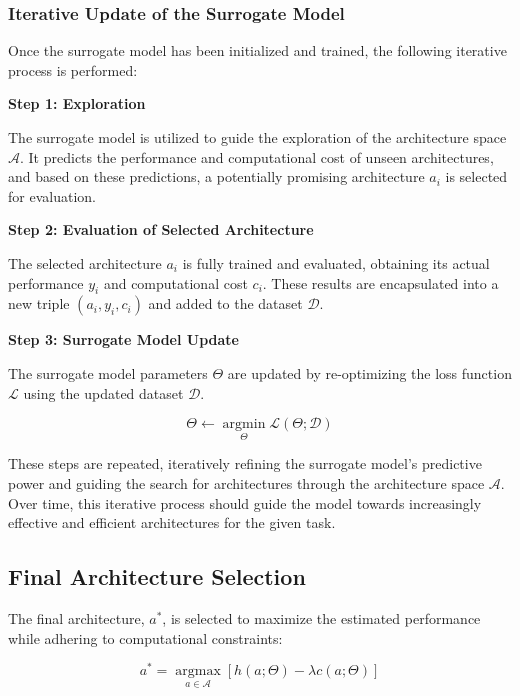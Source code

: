 \documentclass{article}
\begin{document}
\subsubsection{Iterative Update of the Surrogate Model}

Once the surrogate model has been initialized and trained, the following iterative process is performed:

\textbf{Step 1: Exploration}

The surrogate model is utilized to guide the exploration of the architecture space $\mathcal{A}$. It predicts the performance and computational cost of unseen architectures, and based on these predictions, a potentially promising architecture $a_i$ is selected for evaluation.

\textbf{Step 2: Evaluation of Selected Architecture}

The selected architecture $a_i$ is fully trained and evaluated, obtaining its actual performance $y_i$ and computational cost $c_i$. These results are encapsulated into a new triple $(a_i, y_i, c_i)$ and added to the dataset $\mathcal{D}$.

\textbf{Step 3: Surrogate Model Update}

The surrogate model parameters $\Theta$ are updated by re-optimizing the loss function $\mathcal{L}$ using the updated dataset $\mathcal{D}$.

\begin{equation}
\Theta \gets \underset{\Theta}{\operatorname{argmin}} \mathcal{L}(\Theta; \mathcal{D})
\end{equation}

These steps are repeated, iteratively refining the surrogate model's predictive power and guiding the search for architectures through the architecture space $\mathcal{A}$. Over time, this iterative process should guide the model towards increasingly effective and efficient architectures for the given task.

\subsection{Final Architecture Selection}

The final architecture, $a^*$, is selected to maximize the estimated performance while adhering to computational constraints:

\begin{equation}
a^* = \underset{a \in \mathcal{A}}{\operatorname{argmax}} [h(a;\Theta) - \lambda c(a;\Theta)]
\end{equation}
\end{document}
